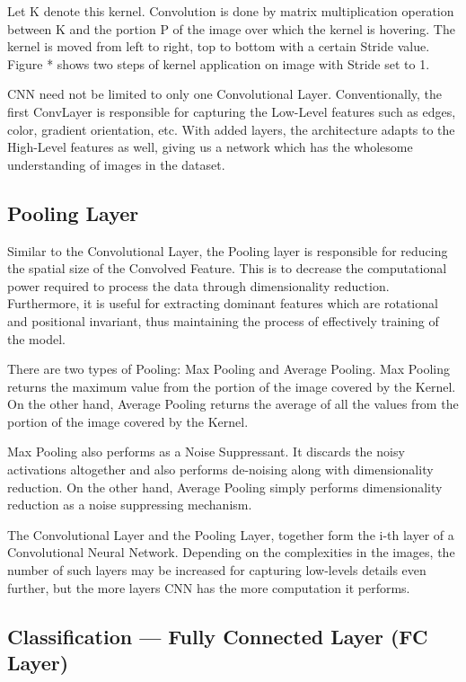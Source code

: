 Let K denote this kernel. Convolution is done by matrix multiplication operation between K and the portion P of the image over which the kernel is hovering. The kernel is moved from left to right, top to bottom with a certain Stride value. Figure * shows two steps of kernel application on image with Stride set to 1. 

CNN need not be limited to only one Convolutional Layer. Conventionally, the first ConvLayer is responsible for capturing the Low-Level features such as edges, color, gradient orientation, etc. With added layers, the architecture adapts to the High-Level features as well, giving us a network which has the wholesome understanding of images in the dataset.

\subsection{Pooling Layer}

Similar to the Convolutional Layer, the Pooling layer is responsible for reducing the spatial size of the Convolved Feature. This is to decrease the computational power required to process the data through dimensionality reduction. Furthermore, it is useful for extracting dominant features which are rotational and positional invariant, thus maintaining the process of effectively training of the model.

There are two types of Pooling: Max Pooling and Average Pooling. Max Pooling returns the maximum value from the portion of the image covered by the Kernel. On the other hand, Average Pooling returns the average of all the values from the portion of the image covered by the Kernel.

Max Pooling also performs as a Noise Suppressant. It discards the noisy activations altogether and also performs de-noising along with dimensionality reduction. On the other hand, Average Pooling simply performs dimensionality reduction as a noise suppressing mechanism. 

The Convolutional Layer and the Pooling Layer, together form the i-th layer of a Convolutional Neural Network. Depending on the complexities in the images, the number of such layers may be increased for capturing low-levels details even further, but the more layers CNN has the more computation it performs.

\subsection{Classification — Fully Connected Layer (FC Layer)}

